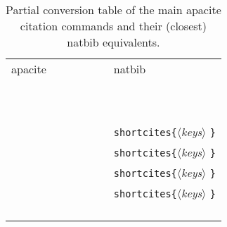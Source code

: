 \documentclass{article}
\makeatletter
\newcommand{\pkg}[1]{\textsf{#1}}%
\newcommand{\cmd}[1]{\texttt{\string#1}}%
\newcommand{\bs}{{\ttfamily \@backslashchar}}%
\newcommand{\opt}[1]{$\langle${\itshape #1}$\rangle$}%
\newcommand{\cmdtwo}[2]{{\mdseries\bs\texttt{#1\{}\opt{#2}%
                        \texttt{\}}}}%
\makeatother
\begin{document}
\begin{table}[htp]
\caption{Partial conversion table of the main \pkg{apacite}
         citation commands and their (closest) \pkg{natbib} equivalents.}
\label{tab:APAnatConv}
\begin{tabular}{lcl}
\hline
\pkg{apacite}          & $\mbox{}\qquad\qquad\mbox{}$ & \pkg{natbib}       \\
\cline{1-1}\cline{3-3}
\cmd{\cite}            &                              & \cmd{\citep}       \\
\cmd{\citeA}           &                              & \cmd{\citet}       \\
\cmd{\citeNP}          &                              & \cmd{\citealp}     \\
\cmd{\citeauthor}      &                              & \cmd{\citeauthor}  \\
\\
\cmd{\fullcite}        &                              & \cmd{\citep*}      \\
\cmd{\fullciteA}       &                              & \cmd{\citet*}      \\
\cmd{\fullciteNP}      &                              & \cmd{\citealp*}    \\
\cmd{\fullciteauthor}  &                              & \cmd{\citeauthor*} \\
\\
\cmd{\shortcite}       &     & \cmdtwo{shortcites}{keys}\cmd{\citep}       \\
\cmd{\shortciteA}      &     & \cmdtwo{shortcites}{keys}\cmd{\citet}       \\
\cmd{\shortciteNP}     &     & \cmdtwo{shortcites}{keys}\cmd{\citealp}     \\
\cmd{\shortciteauthor} &     & \cmdtwo{shortcites}{keys}\cmd{\citeauthor}  \\
\\
\cmd{\citeyear}        &                              & \cmd{\citeyearpar} \\
\cmd{\citeyearNP}      &                              & \cmd{\citeyear}    \\
\cmd{\nocite}          &                              & \cmd{\nocite}      \\
\hline
\end{tabular}
\end{table}
\end{document}
